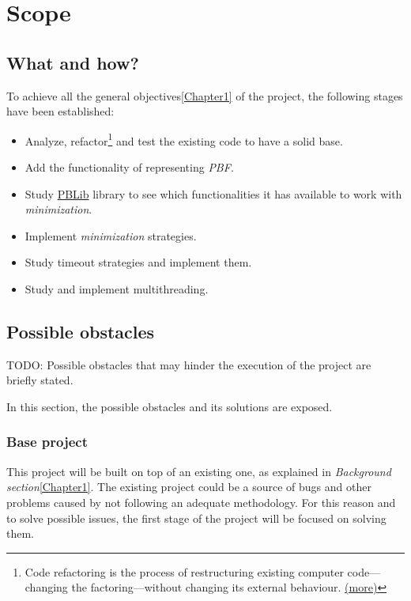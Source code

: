 
\chapter{Scope} %

\label{Chapter2} %

\section{What and how?}

To achieve all the general objectives\ref{Chapter1} of the project, the following stages have been established:
\begin{itemize}
	\item Analyze, refactor\footnote{Code refactoring is the process of restructuring existing computer code—changing the factoring—without changing its external behaviour. \href{https://en.wikipedia.org/wiki/Code_refactoring}{(more)}} and test the existing code to have a solid base. 
	\item Add the functionality of representing \emph{PBF}.
	\item Study \href{http://tools.computational-logic.org/content/pblib.php}{PBLib} library to see which functionalities it has available to work with \emph{minimization}.
	\item Implement \emph{minimization} strategies.
	\item Study timeout strategies and implement them.
	\item Study and implement multithreading.
\end{itemize}

\section{Possible obstacles}

TODO: Possible obstacles that
may hinder the execution of the
project are briefly stated.

In this section, the possible obstacles and its solutions are exposed.

\subsection{Base project}
This project will be built on top of an existing one, as explained in \emph{Background section}\ref{Chapter1}. The existing project could be a source of bugs and other problems caused by not following an adequate methodology. For this reason and to solve possible issues, the first stage of the project will be focused on solving them.
